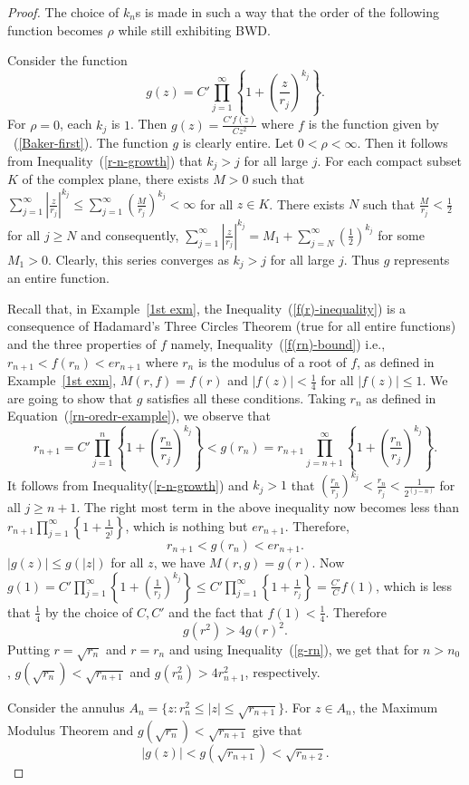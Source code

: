 \documentclass[11pt,a4paper]{article}
\begin{document}
\begin{proof}
	  The choice of $k_n$s is made in such a way that the order of the following function becomes $\rho$ while still exhibiting BWD.
	\par Consider the function 
$$g(z)=C'\prod_{j=1}^{\infty}\left\{1+\left(\frac{z}{r_j}\right)^{k_j}\right\}.$$
For $\rho =0$, each $k_j$ is  $1$. Then $g(z)=\frac{C' f(z)}{C z^2}$ where $f$ is the function given by ~(\ref{Baker-first}). The function $g$ is clearly entire.
Let $0<\rho <\infty$. Then it follows from Inequality~(\ref{r-n-growth}) that $k_j >j$ for all large $j$. For each compact subset $K$ of the complex plane, there exists $M>0$ such that   $\sum_{j=1}^{\infty}\left|\frac{z}{r_j}\right|^{k_j}\leq \sum_{j=1}^{\infty}\left(\frac{M}{r_j}\right)^{k_j}<\infty$ for all $z \in K$. There exists $N$ such that $\frac{M}{r_j}<\frac{1}{2}$ for all $j\geq N$ and consequently, $\sum_{j=1}^{\infty}\left|\frac{z}{r_j}\right|^{k_j}= M_1 +\sum_{j=N}^{\infty}\left(\frac{1}{2}\right)^{k_j}$ for some $M_1>0$. Clearly, this series converges as $k_j >j$ for all large $j$. Thus $g$ represents an entire function.
	\par Recall that, in Example~\ref{1st exm}, the Inequality~(\ref{f(r)-inequality})  is a consequence of  Hadamard's Three Circles Theorem (true for all entire functions) and the three properties of $f$ namely, Inequality~(\ref{f(rn)-bound}) i.e., $r_{n+1} < f(r_n) <er_{n+1}$ where $r_n$ is the modulus of a root of $f$, as defined in Example~\ref{1st exm}, $M(r,f)=f(r)$ and $|f(z)| < \frac{1}{4}$ for all $|f(z)|\leq 1$. We are going to show that $g$ satisfies all these conditions. Taking $r_n$ as defined in Equation~(\ref{rn-oredr-example}), we observe that $$r_{n+1} =C' \prod_{j=1}^{n} \left\{1+\left(\frac{r_n}{r_j}\right)^{k_j}\right\} < g(r_n)=r_{n+1} \prod_{j=n+1}^{\infty} \left\{1+\left(\frac{r_n}{r_j}\right)^{k_j}\right\}.$$
	It follows from Inequality(\ref{r-n-growth}) and $k_j >1$ that $(\frac{r_n}{r_j})^{k_j} <\frac{r_n}{r_j} <  \frac{1}{2^{(j-n)}}$ for all $j \geq n+1$. The right most term in the above inequality now becomes less than $r_{n+1} \prod_{j=1}^{\infty} \left\{1+ \frac{1}{2^j} \right\} $, which is nothing but $e r_{n+1}$. Therefore, \begin{equation}
		r_{n+1}< g(r_n)< e r_{n+1}.
		\label{g-rn}
	\end{equation}
	$|g(z)| \leq g(|z|)$ for all $z$, we have $M(r,g)=g(r)$. Now $g(1)=C' \prod_{j=1}^{\infty}\left\{1+\left(\frac{1}{r_j}\right)^{k_j}\right\}  \leq C'\prod_{j=1}^{\infty} \left\{1+ \frac{1}{r_j}  \right\}=\frac{C'}{C} f(1)$, which is less that $\frac{1}{4}$ by the choice of $C,C'$ and the fact that $f(1) < \frac{1}{4}$. Therefore $$g(r^2) > 4{g(r)}^2.$$  Putting $r=\sqrt{r_{n}}$ and $r=r_n$  and using Inequality~(\ref{g-rn}), we get that for $n>n_0$, $g(\sqrt{r_n})<\sqrt{r_ {n+1} }$ and $g(r_n^2)>4 r_{n+1}^2$, respectively. 
	\par Consider the annulus $A_n=\{z:r_n^{2}\leq|z|\leq \sqrt{r_{n+1}}\}$. For $z\in A_n$, the Maximum Modulus Theorem and $g(\sqrt{r_{n}})<\sqrt{r_{n+1}}$ give that \begin{equation}
		 |g(z)|<g(\sqrt{r_{n+1}})<\sqrt{r_{n+2}}.
		 \label{g-Annulus}
	\end{equation} 
	

\end{proof}
\end{document}
